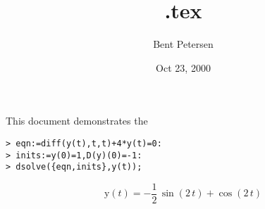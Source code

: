 \documentclass[11pt]{article}
\title{\jobname.tex}
\author{Bent Petersen}
\date{Oct 23, 2000}
\begin{document}
This document demonstrates the 
\begin{verbatim}
> eqn:=diff(y(t),t,t)+4*y(t)=0:
> inits:=y(0)=1,D(y)(0)=-1:
> dsolve({eqn,inits},y(t));
\end{verbatim}
$$
\mathrm{y}(t)= - \frac{1}{2}\,\sin(2\,t) + \cos(2\,t)
$$
\end{document}
